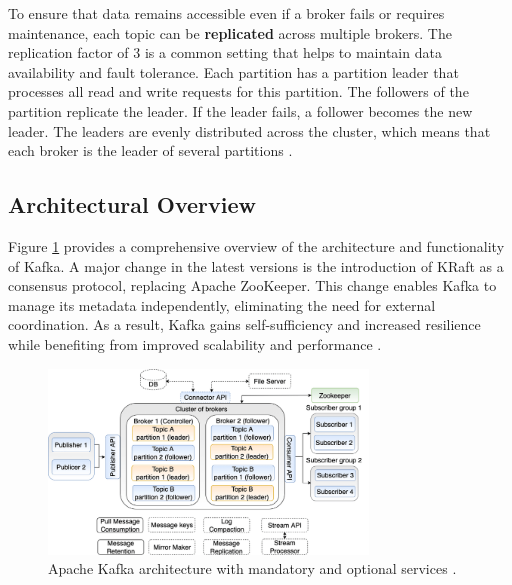 To ensure that data remains accessible even if a broker fails or requires maintenance, each topic can be \textbf{replicated} across multiple brokers. The replication factor of 3 is a common setting that helps to maintain data availability and fault tolerance. Each partition has a partition leader that processes all read and write requests for this partition. The followers of the partition replicate the leader. If the leader fails, a follower becomes the new leader. The leaders are evenly distributed across the cluster, which means that each broker is the leader of several partitions \cite{kafkaDoc}.

\subsection{Architectural Overview}

Figure \ref{fig:architecture} provides a comprehensive overview of the architecture and functionality of Kafka. A major change in the latest versions is the introduction of KRaft as a consensus protocol, replacing Apache ZooKeeper. This change enables Kafka to manage its metadata independently, eliminating the need for external coordination. As a result, Kafka gains self-sufficiency and increased resilience while benefiting from improved scalability and performance \cite{kull2023secure}.

\begin{figure}[ht]
    \centering
    \includegraphics[width=8.5cm]{images/architecture.png}
    \caption{Apache Kafka architecture with mandatory and optional services \cite{lazidis2022publish}.}
    \label{fig:architecture}
\end{figure}